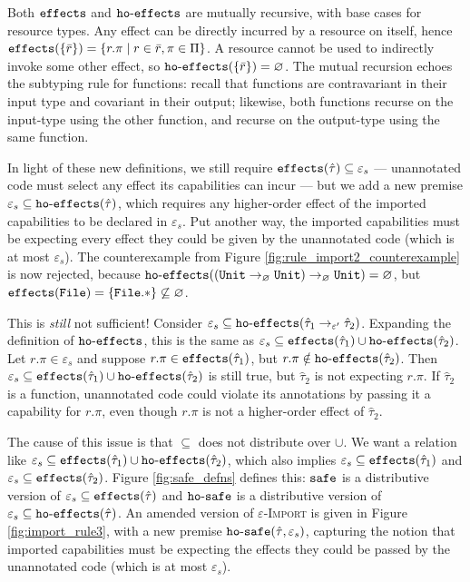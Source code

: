 Both $\mathtt{effects}$ and $\mathtt{ho \hbox{-} effects}$ are mutually recursive,
with base cases for resource types. Any effect can be directly
incurred by a resource on itself, hence
$\mathtt{effects}(\{ \bar r \}) = \{ r.\pi \mid r \in \bar r, \pi \in \Pi \}$. A
resource cannot be used to indirectly invoke some other effect, so
$\mathtt{ho \hbox{-} effects}(\{ \bar r \}) = \varnothing$. The mutual recursion echoes the
subtyping rule for functions: recall that functions are contravariant
in their input type and covariant in their output; likewise, both
functions recurse on the input-type using the other function, and
recurse on the output-type using the same function.

In light of these new definitions, we still require
$\mathtt{effects}(\hat \tau) \subseteq \varepsilon_s$ --- unannotated code must
select any effect its capabilities can incur --- but we add a new
premise $\varepsilon_s \subseteq \mathtt{ho \hbox{-} effects}(\hat \tau)$, which requires
any higher-order effect of the imported capabilities to be declared in
$\varepsilon_s$. Put another way, the imported capabilities must be
expecting every effect they could be given by the unannotated code
(which is at most $\varepsilon_s$). The counterexample from Figure \ref{fig:rule_import2_counterexample} is now rejected, because
$\mathtt{ho \hbox{-} effects}((\mathtt{Unit} \rightarrow_{\varnothing} \mathtt{Unit})
  \rightarrow_{\varnothing} \mathtt{Unit}) = \varnothing$, but
$\mathtt{effects}(\mathtt{File}) = \{ \mathtt{File.*} \} \not\subseteq \varnothing$.

This is
\textit{still} not sufficient! Consider
$\varepsilon_s \subseteq \mathtt{ho \hbox{-} effects}( \hat \tau_1 \rightarrow_{\varepsilon'}
  \hat \tau_2 )$. Expanding the definition of
$\mathtt{ho \hbox{-} effects}$, this is the same as
$\varepsilon_s \subseteq \mathtt{effects}(\hat \tau_1) \cup \mathtt{ho \hbox{-} effects}(\hat
  \tau_2)$. Let $r.\pi \in \varepsilon_s$ and suppose
$r.\pi \in \mathtt{effects}(\hat \tau_1)$, but $r.\pi \notin \mathtt{ho \hbox{-} effects}(\hat
  \tau_2)$. Then
$\varepsilon_s \subseteq \mathtt{effects}(\hat \tau_1) \cup \mathtt{ho \hbox{-} effects}(\hat \tau_2)$ is
still true, but $\hat \tau_2$ is not expecting $r.\pi$. If $\hat \tau_2$ is
a function, unannotated code could violate its annotations by passing it
a capability for $r.\pi$, even though $r.\pi$ is not a higher-order effect
of $\hat \tau_2$.

The cause of this issue is that $\subseteq$
does not distribute over $\cup$. We want a relation like
$\varepsilon_s \subseteq \mathtt{effects}(\hat \tau_1) \cup \mathtt{ho \hbox{-} effects}(\hat \tau_2)$,
which also implies $\varepsilon_s \subseteq \mathtt{effects}(\hat \tau_1)$ and
$\varepsilon_s \subseteq \mathtt{effects}(\hat \tau_2)$. Figure
\ref{fig:safe_defns} defines this: $\mathtt{safe}$ is a distributive
version of $\varepsilon_s \subseteq \mathtt{effects}(\hat \tau)$ and
$\mathtt{ho \hbox{-} safe}$ is a distributive version of
$\varepsilon_s \subseteq \mathtt{ho \hbox{-} effects}(\hat \tau)$. An amended version of
\textsc{$\varepsilon$-Import} is given in Figure \ref{fig:import_rule3},
with a new premise $\mathtt{ho \hbox{-} safe}(\hat \tau, \varepsilon_s)$, capturing the
notion that imported capabilities must be expecting the effects they could
be passed by the unannotated code (which is at most $\varepsilon_s$).

